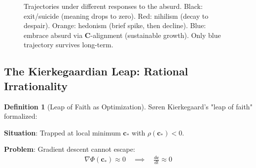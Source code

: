 \documentclass[11pt,a4paper]{article}
\theoremstyle{definition}
\newtheorem{definition}{Definition}[section]
\theoremstyle{remark}
\newcommand{\cc}{\mathbf{c}}
\begin{document}
\begin{enumerate}
\begin{figure}[H]
\centering
{}
\caption{Trajectories under different responses to the absurd. Black: exit/suicide (meaning drops to zero). Red: nihilism (decay to despair). Orange: hedonism (brief spike, then decline). Blue: embrace absurd via \(\mathbf{C}\)-alignment (sustainable growth). Only blue trajectory survives long-term.}
\label{fig:absurd_responses}
\end{figure}

\subsection{The Kierkegaardian Leap: Rational Irrationality}

\begin{definition}[Leap of Faith as Optimization]
Søren Kierkegaard's "leap of faith" formalized:

\textbf{Situation}: Trapped at local minimum \(\cc_*\) with \(\rho(\cc_*) < 0\).

\textbf{Problem}: Gradient descent cannot escape:
\begin{align}
\nabla \Phi(\cc_*) \approx 0 \quad \implies \quad \frac{d\cc}{dt} \approx 0
\end{align}


\end{definition}
\end{enumerate}
\end{document}
